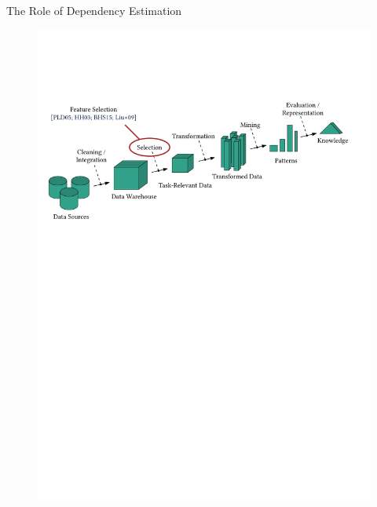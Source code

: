 \documentclass[16pt,usenames,dvipsnames, notheorems]{beamer}
\theoremstyle{definition}
\theoremstyle{example}
\theoremstyle{plain}
\begin{document}
\begin{frame}{The Role of Dependency Estimation}
\begin{figure}
\begin{overprint}
		 \includegraphics[width=0.98\linewidth]{figures/kdd_r2-compressed.pdf}

\end{overprint}
\end{figure}
\end{frame}
\end{document}
